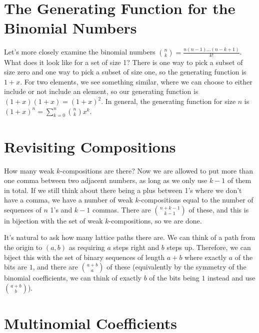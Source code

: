 \classheader{}

\section*{The Generating Function for the Binomial Numbers}

Let's more closely examine the binomial numbers $\binom{n}{k} = \frac{n(n-1)\dots (n-k+1)}{k!}$.  What does it look like for a set of size 1?  There is one way to pick a subset of size zero and one way to pick a subset of size one, so the generating function is $1+x$.  For two elements, we see something similar, where we can choose to either include or not include an element, so our generating function is $(1+x)(1+x)=(1+x)^2$.  In general, the generating function for size $n$ is $(1+x)^n = \sum\limits_{k=0}^{n}\binom{n}{k}x^k$.

\section*{Revisiting Compositions}


How many weak $k$-compositions are there?  Now we are allowed to put more than one comma between two adjacent numbers, as long as we only use $k-1$ of them in total.  If we still think about there being a plus between 1's where we don't have a comma, we have a number of weak $k$-compositions equal to the number of sequences of $n$ 1's and $k-1$ commas.  There are $\binom{n+k-1}{k-1}$ of these, and this is in bijection with the set of weak $k$-compositions, so we are done.



It's natural to ask how many lattice paths there are.  We can think of a path from the origin to $(a,b)$ as requiring $a$ steps right and $b$ steps up.  Therefore, we can biject this with the set of binary sequences of length $a+b$ where exactly $a$ of the bits are $1$, and there are $\binom{a+b}{a}$ of these (equivalently by the symmetry of the binomial coefficients, we can think of exactly $b$ of the bits being $1$ instead and use $\binom{a+b}{b}$).

\section*{Multinomial Coefficients}

